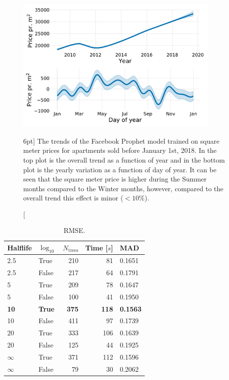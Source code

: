 \documentclass[a4paper, twoside]{tufte-book}
\begin{document}
\begin{figure}
  \includegraphics[width=0.9\textwidth]{figures/housing/Ejerlejlighed_v17_cut_all_Ncols_all_prophet_trends.pdf}
  \caption[Prophet Trends][6pt]
          {The trends of the Facebook Prophet model trained on square meter prices for apartments sold before January 1st, 2018. In the top plot is the overall trend as a function of year and in the bottom plot is the yearly variation as a function of day of year. It can be seen that the square meter price is higher during the Summer months compared to the Winter months, however, compared to the overall trend this effect is minor ($<10\%$). 
          }
  \label{fig:h:prophet_trends}
\end{figure}




\begin{table}[]
  \begin{tabular}{@{}llrrl@{}}
    \toprule
  Halflife & $\log_{10}$ & $N_\mathrm{trees}$ & Time [$s$]   & MAD    \\ \midrule
  2.5 & True & 210 & 81  & 0.1651 \\
  2.5 & False & 217 & 64  & 0.1791 \\
  5   & True & 209 & 78  & 0.1647 \\
  5   & False & 100 & 41  & 0.1950  \\
  \textbf{10}  & \textbf{True} & \textbf{375} & \textbf{118} & \textbf{0.1563} \\
  10  & False & 411 & 97   & 0.1739 \\
  20  & True & 333 & 106 & 0.1639 \\
  20  & False & 125 & 44  & 0.1925 \\
  $\infty$   & True & 371 & 112 & 0.1596 \\
  $\infty$   & False & 79  & 30  & 0.2062 \\ \bottomrule
  \end{tabular}
  \caption{\label{tab:h:HPO_initial_RMSE}RMSE.}
  \end{table}
  
\end{document}
